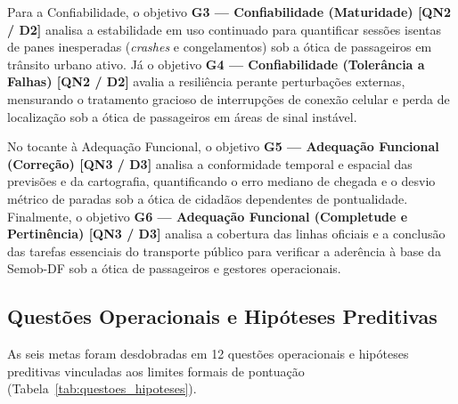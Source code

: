 \documentclass[11pt,a4paper]{article}
\begin{document}
Para a Confiabilidade, o objetivo \textbf{G3 --- Confiabilidade (Maturidade) [QN2 / D2]} analisa a estabilidade em uso continuado para quantificar sessões isentas de panes inesperadas (\textit{crashes} e congelamentos) sob a ótica de passageiros em trânsito urbano ativo. Já o objetivo \textbf{G4 --- Confiabilidade (Tolerância a Falhas) [QN2 / D2]} avalia a resiliência perante perturbações externas, mensurando o tratamento gracioso de interrupções de conexão celular e perda de localização sob a ótica de passageiros em áreas de sinal instável.

No tocante à Adequação Funcional, o objetivo \textbf{G5 --- Adequação Funcional (Correção) [QN3 / D3]} analisa a conformidade temporal e espacial das previsões e da cartografia, quantificando o erro mediano de chegada e o desvio métrico de paradas sob a ótica de cidadãos dependentes de pontualidade. Finalmente, o objetivo \textbf{G6 --- Adequação Funcional (Completude e Pertinência) [QN3 / D3]} analisa a cobertura das linhas oficiais e a conclusão das tarefas essenciais do transporte público para verificar a aderência à base da Semob-DF sob a ótica de passageiros e gestores operacionais.

\subsection{Questões Operacionais e Hipóteses Preditivas}
\label{sec:questoes_hipoteses}

As seis metas foram desdobradas em 12 questões operacionais e hipóteses preditivas vinculadas aos limites formais de pontuação (Tabela~\ref{tab:questoes_hipoteses}).
\end{document}

